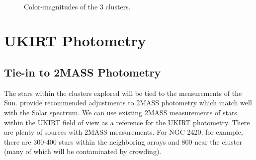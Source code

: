 \documentclass{aastex6}
\begin{document}
\begin{figure}[!t]
\centering
{}
\\
	\caption{Color-magnitudes of the 3 clusters.}
	\label{fig:cmdPS}
\end{figure} 

\section{UKIRT Photometry}

\subsection{Tie-in to 2MASS Photometry}

The stars within the clusters explored will be tied to the measurements of the Sun.
\citet{rieke2008absIRcal} provide recommended adjustments to 2MASS photometry which match well with the Solar spectrum.
We can use existing 2MASS measurements of stars within the UKIRT field of view as a reference for the UKIRT photometry.
There are plenty of sources with 2MASS measurements.
For NGC 2420, for example, there are 300-400 stars within the neighboring arrays and 800 near the cluster (many of which will be contaminated by crowding).
\end{document}
